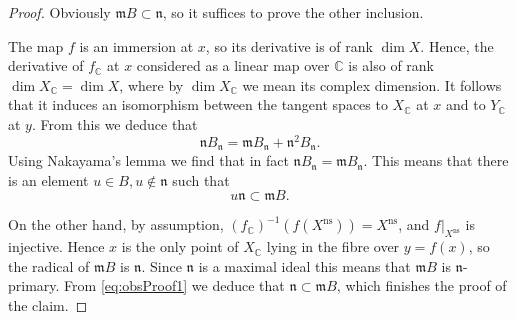 \documentclass[10pt,a4paper]{amsart}
\newcommand{\C}{\mathbb{C}}
\newcommand{\ns}{\mathrm{ns}}
\begin{document}
\begin{proof}
Obviously $\mathfrak mB\subset\mathfrak n$, so it suffices to prove the other inclusion.

The map $f$ is an immersion at $x$, so its derivative is of rank $\dim X$. Hence, the derivative of $f_\C$ at $x$ considered as a linear map over $\C$ is also of rank $\dim X_\C=\dim X$, where by $\dim X_\C$ we mean its complex dimension. It follows that it induces an isomorphism between the tangent spaces to $X_\C$ at $x$ and to $Y_\C$ at $y$. From this we deduce that
\begin{equation*}
    \mathfrak nB_{\mathfrak n}=\mathfrak m B_{\mathfrak n}+\mathfrak n^2B_{\mathfrak n}.
\end{equation*}
Using Nakayama's lemma we find that in fact $\mathfrak nB_{\mathfrak n}=\mathfrak m B_{\mathfrak n}$. This means that there is an element $u\in B,u\not \in \mathfrak n$ such that 
\begin{equation}\label{eq:obsProof1}
    u\mathfrak n\subset \mathfrak mB.    
\end{equation}

On the other hand, by assumption, $(f_\C)^{-1}(f(X^\ns))=X^\ns$, and $f|_{X^\ns}$ is
injective. Hence $x$ is the only point of $X_\C$ lying in the fibre over $y=f(x)$, so the radical of $\mathfrak mB$ is $\mathfrak n$. Since $\mathfrak n$ is a maximal ideal this means that $\mathfrak m B$ is $\mathfrak n$-primary. From \eqref{eq:obsProof1} we deduce that $\mathfrak n\subset \mathfrak m B$, which finishes the proof of the claim.
\end{proof}
\end{document}

